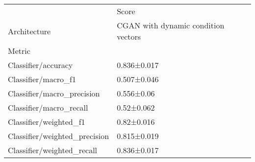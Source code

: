 \begin{tabular}{ll}
\toprule
{} &                               Score \\
Architecture & CGAN with dynamic condition vectors \\
Metric                        &                                     \\
\midrule
Classifier/accuracy           &                         0.836±0.017 \\
Classifier/macro\_f1           &                         0.507±0.046 \\
Classifier/macro\_precision    &                          0.556±0.06 \\
Classifier/macro\_recall       &                          0.52±0.062 \\
Classifier/weighted\_f1        &                          0.82±0.016 \\
Classifier/weighted\_precision &                         0.815±0.019 \\
Classifier/weighted\_recall    &                         0.836±0.017 \\
\bottomrule
\end{tabular}
